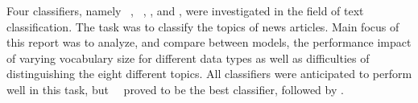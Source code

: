 \noindent Four classifiers, namely \bn\ \nb, \mn\ \nb, \rf, and \svm, were investigated in the field of text classification. The task was to classify the topics of news articles. Main focus of this report was to analyze, and compare between models, the performance impact of varying vocabulary size for different data types as well as difficulties of distinguishing the eight different topics. All classifiers were anticipated to perform well in this task, but \mn\ \nb\ proved to be the best classifier, followed by \svm.

